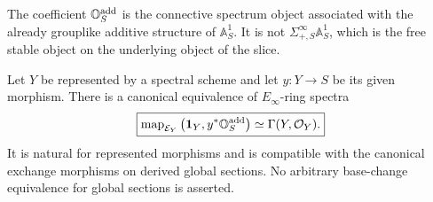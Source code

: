 \begin{remark}
The coefficient \(\mathbb O_S^{\mathrm{add}}\) is the connective spectrum object associated with the already
grouplike additive structure of \(\mathbb A^1_S\).  It is not
\(\Sigma^\infty_{+,S}\mathbb A^1_S\), which is the free stable object on the underlying object of
the slice.
\end{remark}

\begin{proposition}
\label{prop:additive-scalar-represents-functions}
Let \(Y\) be represented by a spectral scheme and let \(y:Y\to S\) be its given morphism.  There is a canonical equivalence of \(E_\infty\)-ring spectra
\[
\boxed{
    \operatorname{map}_{\mathcal E_Y}
    \left(
        \mathbf 1_Y,
        y^*\mathbb O_S^{\mathrm{add}}
    \right)
    \simeq
    \Gamma(Y,\mathcal O_Y).
}
\]
It is natural for represented morphisms and is compatible with the canonical exchange morphisms on
derived global sections.  No arbitrary base-change equivalence for global sections is asserted.
\end{proposition}

